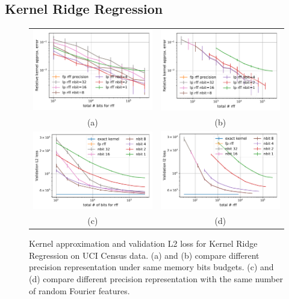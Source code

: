 \documentclass[12pt]{article}
\begin{document}
\subsection{Kernel Ridge Regression}
\begin{figure}
\centering
\begin{tabular}{c c}
	\includegraphics[width=.45\linewidth]{figures/kernel_approx_error.pdf} &
	\includegraphics[width=.45\linewidth]{figures/kernel_approx_error_n_fp.pdf} \\
	(a) & (b) \\
	\includegraphics[width=.45\linewidth]{figures/valid_l2.pdf} &
	\includegraphics[width=.45\linewidth]{figures/valid_l2_n_fp.pdf}  \\
		(c) & (d) \\
\end{tabular}
\caption{Kernel approximation and validation L2 loss for Kernel Ridge Regression on UCI Census data. (a) and (b) compare different precision representation under same memory bits budgets. (c) and (d) compare different precision representation with the same number of random Fourier features.}
\label{fig:kernel_and_l2}
\end{figure}
\end{document}
